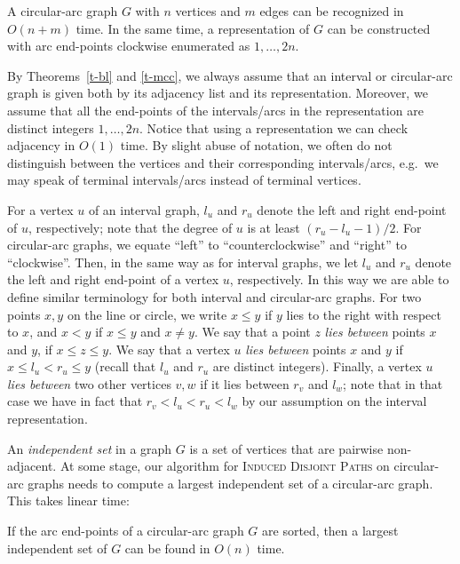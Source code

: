 \documentclass{llncs}
\newcommand{\eg}{e.g.~}
\newcommand{\problemIDP}{\textsc{Induced Disjoint Paths}}
\begin{document}
\begin{theorem}[\cite{M2003}]\label{t-mcc}
A circular-arc graph $G$ with $n$ vertices and $m$ edges can be recognized in $O(n+m)$ time. In the same time, a representation of $G$ can be constructed with arc end-points 
clockwise enumerated as $1,\ldots,2n$.   
\end{theorem}

By Theorems~\ref{t-bl} and \ref{t-mcc}, we always assume that an interval or circular-arc graph is given both by its adjacency list and its representation. Moreover, we assume that all the end-points of the intervals/arcs in the representation are distinct integers $1,\ldots,2n$. 
Notice that using a representation we can check adjacency in $O(1)$ time. 
By slight abuse of notation, we often do not distinguish between the vertices and their corresponding intervals/arcs, \eg we may speak of terminal intervals/arcs instead of terminal vertices.

For a vertex $u$ of an interval graph, $l_u$ and $r_u$ denote the left and right end-point of $u$, respectively; note that the degree of $u$ is at least $(r_u-l_u-1)/2$.
For circular-arc graphs, we equate ``left'' to ``counterclockwise'' and ``right'' to ``clockwise''. Then, in the same way as for interval graphs,  we let $l_u$ and $r_u$ denote the left and right end-point of a vertex $u$, respectively. In this way we are able to define similar terminology for both interval and circular-arc graphs. 
For two points $x,y$ on the line or circle, we write $x\leq y$ if $y$ lies to the right with respect to $x$, and $x<y$ if $x\leq  y$ and $x\neq y$.
We say that a point $z$ \emph{lies between} points $x$ and $y$, if $x\leq z\leq y$. 
We say that a vertex $u$ {\em lies between} points $x$ and $y$ if $x\leq l_u < r_u \leq y$ (recall that $l_u$ and $r_u$ are distinct integers).
Finally, a vertex $u$ \emph{lies between} two other vertices $v,w$ if it lies between $r_v$ and $l_w$; note that 
in that case we have in fact that $r_v< l_u< r_u< l_w$ by our assumption on the interval representation.

An {\it independent set} in a graph $G$ is a set of vertices that are pairwise non-adjacent.  
At some stage, our algorithm for \problemIDP{} on circular-arc graphs needs to compute a largest independent set of a circular-arc graph. This takes linear time:

\begin{theorem}\label{t-maxin}
If the arc end-points of a circular-arc graph $G$ are sorted,  then
a largest independent set of $G$ can be found in $O(n)$ time.
\end{theorem}
\end{document}
